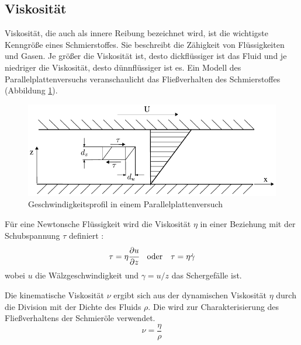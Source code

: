 \subsection*{Viskosität}
\label{sub:viskositaet}
Viskosität, die auch als innere Reibung bezeichnet wird, ist die wichtigste Kenngröße eines Schmierstoffes.
Sie beschreibt die Zähigkeit von Flüssigkeiten und Gasen.
Je größer die Viskosität ist, desto dickflüssiger ist das Fluid und je niedriger die Viskosität, desto dünnflüssiger ist es.
Ein Modell des Parallelplattenversuchs veranschaulicht das Fließverhalten des Schmierstoffes (Abbildung \ref{fig:geschwindigkeitsprofil_parallelplattenversuch}).
\begin{figure}[htb]
    \centering
    \includegraphics[]{./images/parallelplattenversuch.pdf}
    \caption{Geschwindigkeitsprofil in einem Parallelplattenversuch\cite{wisniewski}}
    \label{fig:geschwindigkeitsprofil_parallelplattenversuch}
\end{figure}

Für eine Newtonsche Flüssigkeit wird die Viskosität $\eta$ in einer Beziehung mit der Schubspannung $\tau$ definiert \cite{viscosity_wiki}:
\begin{equation}
    \tau = \eta \cfrac{\partial u}{\partial z} \quad \text{oder} \quad \tau = \eta \dot{\gamma}
    \label{eq:viskositaet}
\end{equation}
%
wobei $u$ die Wälzgeschwindigkeit und $\gamma = u/z$ das Schergefälle ist.


Die kinematische Viskosität $\nu$ ergibt sich aus der dynamischen Viskosität $\eta$ durch die Division mit der Dichte des Fluids $\rho$. Die wird zur Charakterisierung des Fließverhaltens der Schmieröle verwendet.
\begin{equation}
    \nu = \frac{\eta}{\rho}
    \label{eq:kinematische_viskotitaet}
\end{equation}

